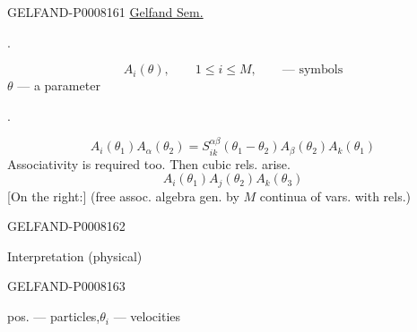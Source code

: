 \begin{GelfandAdjacentEvidence}{GELFAND-P000816}{1}
\qquad \uline{Gelfand Sem.}

.

\[
A_i(\theta),\qquad 1\le i\le M,\qquad\text{— symbols}
\]
\(\theta\) — a parameter

.

\begin{equation*}
A_i(\theta_1)A_\alpha(\theta_2)
=S_{ik}^{\alpha\beta}(\theta_1-\theta_2)A_\beta(\theta_2)A_k(\theta_1)\tag{1}
\end{equation*}
Associativity is required too. Then cubic rels. arise.
\[
A_i(\theta_1)A_j(\theta_2)A_k(\theta_3)
\]
[On the right:] (free assoc. algebra gen. by \(M\) continua of vars. with rels.)
\end{GelfandAdjacentEvidence}
\begin{GelfandAdjacentEvidence}{GELFAND-P000816}{2}


Interpretation (physical)

\end{GelfandAdjacentEvidence}
\begin{GelfandAdjacentEvidence}{GELFAND-P000816}{3}

pos. — particles,\quad \(\theta_i\) — velocities
\end{GelfandAdjacentEvidence}
